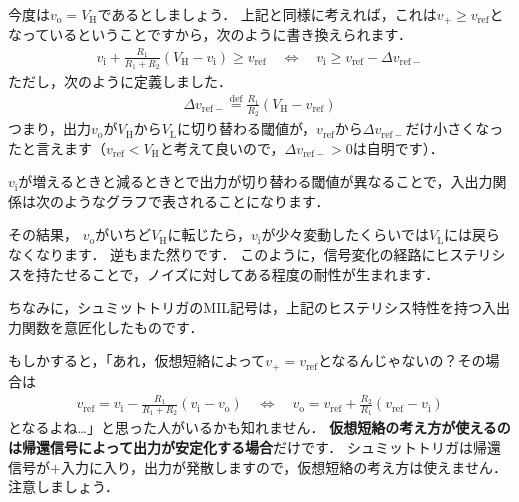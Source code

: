 ﻿\documentclass[a4paper]{jsarticle}
\begin{document}
今度は$v_{\mathrm{o}}=V_{\mathrm{H}}$であるとしましょう．
上記と同様に考えれば，これは$v_{+}\geq v_{\mathrm{ref}}$となっているということですから，次のように書き換えられます．
\begin{align*}
v_{\mathrm{i}}+\frac{R_{1}}{R_{1}+R_{2}}(V_{\mathrm{H}}-v_{\mathrm{i}})\geq v_{\mathrm{ref}}
\quad\Leftrightarrow\quad
v_{\mathrm{i}}\geq v_{\mathrm{ref}}-\varDelta v_{\mathrm{ref}-}
\end{align*}
ただし，次のように定義しました．
\begin{align*}
\varDelta v_{\mathrm{ref}-}\overset{\mathrm{def}}{=}\frac{R_{1}}{R_{2}}(V_{\mathrm{H}}-v_{\mathrm{ref}})
\end{align*}
つまり，出力$v_{\mathrm{o}}$が$V_{\mathrm{H}}$から$V_{\mathrm{L}}$に切り替わる閾値が，$v_{\mathrm{ref}}$から$\varDelta v_{\mathrm{ref}-}$だけ小さくなったと言えます（$v_{\mathrm{ref}}<V_{\mathrm{H}}$と考えて良いので，$\varDelta v_{\mathrm{ref}-}>0$は自明です）．

$v_{\mathrm{i}}$が増えるときと減るときとで出力が切り替わる閾値が異なることで，入出力関係は次のようなグラフで表されることになります．
\begin{figure}[h]
\begin{center}

\end{center}
\end{figure}

その結果，
$v_{\mathrm{o}}$がいちど$V_{\mathrm{H}}$に転じたら，$v_{\mathrm{i}}$が少々変動したくらいでは$V_{\mathrm{L}}$には戻らなくなります．
逆もまた然りです．
このように，信号変化の経路にヒステリシスを持たせることで，ノイズに対してある程度の耐性が生まれます．

\begin{figure}[h]
\begin{center}

\end{center}
\end{figure}

ちなみに，シュミットトリガのMIL記号は，上記のヒステリシス特性を持つ入出力関数を意匠化したものです．

\begin{figure}[h]
\begin{center}

\end{center}
\end{figure}

もしかすると，「あれ，仮想短絡によって$v_{+}=v_{\mathrm{ref}}$となるんじゃないの？その場合は
\begin{align*}
v_{\mathrm{ref}}=v_{\mathrm{i}}-\frac{R_{1}}{R_{1}+R_{2}}(v_{\mathrm{i}}-v_{\mathrm{o}})
\quad\Leftrightarrow\quad
v_{\mathrm{o}}=v_{\mathrm{ref}}+\frac{R_{2}}{R_{1}}(v_{\mathrm{ref}}-v_{\mathrm{i}})
\end{align*}
となるよね…」と思った人がいるかも知れません．
{\bf 仮想短絡の考え方が使えるのは帰還信号によって出力が安定化する場合}だけです．
シュミットトリガは帰還信号が$+$入力に入り，出力が発散しますので，仮想短絡の考え方は使えません．
注意しましょう．
\end{document}
